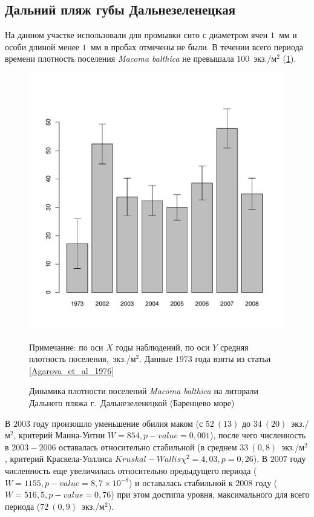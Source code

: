 \documentclass[12pt, a4paper]{disser}
\begin{document}
		\subsection{Дальний пляж губы Дальнезеленецкая}
На данном участке использовали для промывки сито с диаметром ячеи $1$~мм и особи длиной менее $1$~мм в пробах отмечены не были. 
В течении всего периода времени плотность поселения {\it Macoma balthica} не превышала $100$~экз./м$^2$ (\ref{ris:dynamic_Zelency}). 
	\begin{figure}[h]
		\includegraphics{../Barenc_Sea/Dalnezeleneckaya/N_dynamic_with_Agarova.pdf}
	\caption{Динамика плотности поселений {\it Macoma balthica} на литорали Дальнего пляжа г.~Дальнезеленецкой (Баренцево море)}
{\footnotesize Примечание: по оси $X$ \textemdash годы наблюдений, по оси $Y$ \textemdash средняя плотность поселения,~экз./м$^2$. Данные $1973$ года взяты из статьи \ref{Agarova_et_al_1976}}
	\label{ris:dynamic_Zelency}
	\end{figure}
В $2003$ году произошло уменьшение обилия маком (с $52~(13)$ до $34~(20)$~экз./м$^2$, критерий Манна-Уитни  $W = 854, p-value = 0,001$), после чего численность  в $2003 - 2006$ оставалась относительно стабильной (в среднем $33~(0,8)$~экз./м$^2$, критерий Краскела-Уоллиса $Kruskal-Wallis \chi^2 = 4,03, p = 0,26$). 
В $2007$ году численность еще увеличилась относительно предыдущего периода ($W = 1155, p-value = 8,7 \times 10^{-8}$) и оставалась стабильной к $2008$ году ($W = 516,5, p-value = 0,76$) при этом достигла уровня, максимального для всего периода ($72~(0,9)$~экз./м$^2$).
\end{document}
